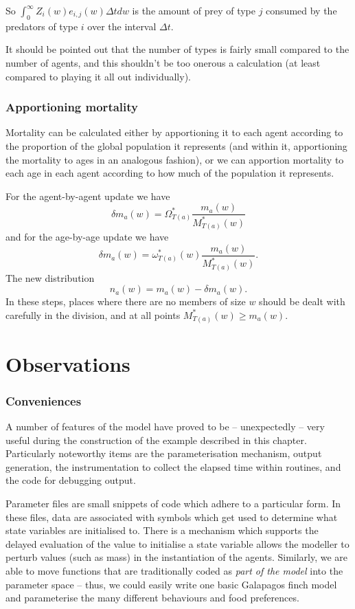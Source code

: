 So $\int_0^{\infty} Z_i (w) e_{i,j} (w) \Delta t d w$ is the amount of prey of
type $j$ consumed by the predators of type $i$ over the interval $\Delta t$.



It should be pointed out that the number of types is fairly small compared to
the number of agents, and this shouldn't be too onerous a calculation (at
least compared to playing it all out individually).

\subsubsection{Apportioning mortality}

Mortality can be calculated either by apportioning it to each agent according
to the proportion of the global population it represents (and within it,
apportioning the mortality to ages in an analogous fashion), or we can
apportion mortality to each age in each agent according to how much of the
population it represents.

For the agent-by-agent update we have
\[ \delta m_a (w) = \Omega^{\ast}_{T (a)}  \frac{m_a (w)}{M^{\ast}_{T (a)}
(w)} \]
and for the age-by-age update we have
\[ \delta m_a (w) = \omega^{\ast}_{T (a)} (w)  \frac{m_a (w)}{M^{\ast}_{T (a)}
(w)} . \]
The new distribution
\[ n_a (w) = m_a (w) - \delta m_a (w) . \]
In these steps, places where there are no members of size $w$ should be dealt
with carefully in the division, and at all points $M^{\ast}_{T (a)} (w)
\geqslant m_a (w)$.


\section{Observations}

\subsubsection{Conveniences}
A number of features of the model have proved to be -- unexpectedly --
very useful during the construction of the example described in this
chapter. Particularly noteworthy items are the parameterisation
mechanism, output generation, the instrumentation to collect the
elapsed time within routines, and the code for debugging output.

Parameter files are small snippets of \Scheme code which adhere to a
particular form. In these files, data are associated with symbols
which get used to determine what state variables are initialised to.
There is a mechanism which supports the delayed evaluation of the
value to initialise a state variable allows the modeller to perturb
values (such as mass) in the instantiation of the agents.  Similarly,
we are able to move functions that are traditionally coded
as \emph{part of the model} into the parameter space -- thus, we could
easily write one basic Galapagos finch model and parameterise the many
different behaviours and food preferences.

